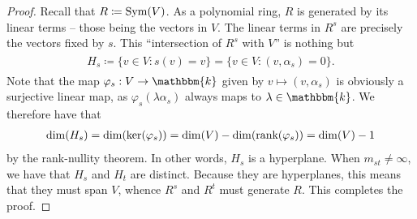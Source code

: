 \noindent\begin{proof} Recall that $R \coloneqq \textup{Sym}(V)$. As a polynomial ring, $R$ is generated by its linear terms -- those being the vectors in $V$. The linear terms in $R^s$ are precisely the vectors fixed by $s$. This ``intersection of $R^s$ with $V$'' is nothing but
\begin{align*}
\begin{split}
H_s \coloneqq \{v \in V : s(v) = v\} = \{v \in V : (v, \alpha_s) = 0\}.
\end{split}
\end{align*}
Note that the map $\varphi_s : V \to \mathbbm{k}$ given by $v \mapsto (v, \alpha_s)$ is obviously a surjective linear map, as $\varphi_s(\lambda\alpha_s)$ always maps to $\lambda \in \mathbbm{k}$. We therefore have that
\begin{align*}
\begin{split}
\dim(H_s) = \dim(\ker(\varphi_s)) = \dim(V)-\dim(\textup{rank}(\varphi_s)) = \dim(V)-1
\end{split}
\end{align*}
\noindent by the rank-nullity theorem. In other words, $H_s$ is a hyperplane. When $m_{st} \neq \infty$, we have that $H_s$ and $H_t$ are distinct. Because they are hyperplanes, this means that they must span $V$, whence $R^s$ and $R^t$ must generate $R$. This completes the proof.
\end{proof}\\

